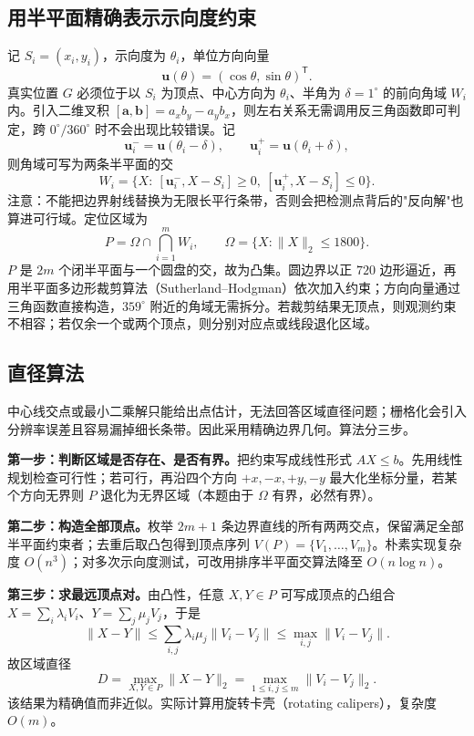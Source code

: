 \documentclass[12pt,a4paper]{ctexart}
\begin{document}
\subsection{用半平面精确表示示向度约束}
\label{sec:q1-halfplane}
记 $S_i=(x_i,y_i)$，示向度为 $\theta_i$，单位方向向量
\begin{equation}
 \bm u(\theta)=(\cos\theta,\sin\theta)^{\mathsf T}.
\end{equation}
真实位置 $G$ 必须位于以 $S_i$ 为顶点、中心方向为 $\theta_i$、半角为 $\delta=1^\circ$ 的前向角域 $W_i$ 内。引入二维叉积 $[\bm a,\bm b]=a_x b_y-a_y b_x$，则左右关系无需调用反三角函数即可判定，跨 $0^\circ/360^\circ$ 时不会出现比较错误。记
\[
 \bm u_i^-=\bm u(\theta_i-\delta),\qquad
 \bm u_i^+=\bm u(\theta_i+\delta),
\]
则角域可写为两条半平面的交
\begin{equation}
 W_i=\bigl\{X:\ [\bm u_i^-,X-S_i]\geq0,\ [\bm u_i^+,X-S_i]\leq0\bigr\}.
\end{equation}
注意：不能把边界射线替换为无限长平行条带，否则会把检测点背后的"反向解"也算进可行域。定位区域为
\begin{equation}
 P=\Omega\cap\bigcap_{i=1}^{m}W_i,
 \qquad \Omega=\{X:\|X\|_2\leq1800\}.
 \label{eq:region}
\end{equation}
$P$ 是 $2m$ 个闭半平面与一个圆盘的交，故为凸集。圆边界以正 $720$ 边形逼近，再用半平面多边形裁剪算法（Sutherland--Hodgman）依次加入约束；方向向量通过三角函数直接构造，$359^\circ$ 附近的角域无需拆分。若裁剪结果无顶点，则观测约束不相容；若仅余一个或两个顶点，则分别对应点或线段退化区域。

\subsection{直径算法}
\label{sec:q1-diameter}
中心线交点或最小二乘解只能给出点估计，无法回答区域直径问题；栅格化会引入分辨率误差且容易漏掉细长条带。因此采用精确边界几何。算法分三步。

\textbf{第一步：判断区域是否存在、是否有界。}把约束写成线性形式 $AX\le b$。先用线性规划检查可行性；若可行，再沿四个方向 $+x,-x,+y,-y$ 最大化坐标分量，若某个方向无界则 $P$ 退化为无界区域（本题由于 $\Omega$ 有界，必然有界）。

\textbf{第二步：构造全部顶点。}枚举 $2m+1$ 条边界直线的所有两两交点，保留满足全部半平面约束者；去重后取凸包得到顶点序列 $V(P)=\{V_1,\ldots,V_m\}$。朴素实现复杂度 $O(n^3)$；对多次示向度测试，可改用排序半平面交算法降至 $O(n\log n)$。

\textbf{第三步：求最远顶点对。}由凸性，任意 $X,Y\in P$ 可写成顶点的凸组合 $X=\sum_i\lambda_i V_i$、$Y=\sum_j\mu_j V_j$，于是
\[
 \|X-Y\|\le\sum_{i,j}\lambda_i\mu_j\|V_i-V_j\|\le\max_{i,j}\|V_i-V_j\|.
\]
故区域直径
\begin{equation}
 D=\max_{X,Y\in P}\|X-Y\|_2
  =\max_{1\le i,j\le m}\|V_i-V_j\|_2.
 \label{eq:diameter}
\end{equation}
该结果为精确值而非近似。实际计算用旋转卡壳（rotating calipers），复杂度 $O(m)$。
\end{document}
